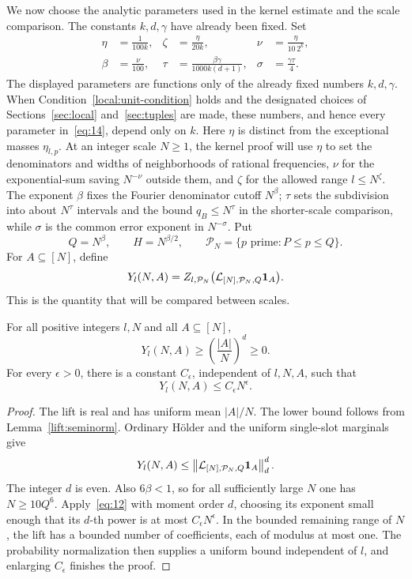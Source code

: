 We now choose the analytic parameters used in the kernel estimate and
the scale comparison.  The constants \(k,d,\gamma\) have already been
fixed.  Set
\begin{equation}
 \begin{aligned}
 \eta&=\frac1{100k},&
 \zeta&=\frac{\eta}{20k},&
 \nu&=\frac{\eta}{10\,2^k},\\
 \beta&=\frac{\nu}{100},&
 \tau&=\frac{\beta\gamma}{1000k(d+1)},&
 \sigma&=\frac{\gamma\tau}{4}.
 \end{aligned}
 \label{eq:14}
\end{equation}
The displayed parameters are functions only of the already fixed numbers
\(k,d,\gamma\).  When Condition~\eqref{local:unit-condition} holds and the
designated choices of Sections~\ref{sec:local} and~\ref{sec:tuples} are made,
these numbers, and hence every parameter in~\eqref{eq:14}, depend only on
\(k\).
Here \(\eta\) is distinct from the exceptional masses \(\eta_{l,p}\).
At an integer scale \(N\ge1\), the kernel proof will use \(\eta\) to
set the denominators and widths of neighborhoods of rational frequencies,
\(\nu\) for the exponential-sum saving \(N^{-\nu}\) outside them,
and \(\zeta\) for the allowed range \(l\le N^\zeta\).
The exponent \(\beta\) fixes the Fourier denominator cutoff \(N^\beta\);
\(\tau\) sets the subdivision into about \(N^\tau\) intervals and
the bound \(q_B\le N^\tau\) in the shorter-scale comparison, while
\(\sigma\) is the common error exponent in \(N^{-\sigma}\).
Put
\[
 Q=N^\beta,\qquad H=N^{\beta/2},\qquad
 \mathcal P_N=\{p\text{ prime}:P\le p\le Q\}.
\]
For \(A\subseteq[N]\), define
\[
 Y_l(N,A)=Z_{l,\mathcal P_N}
             \bigl(\mathcal L_{[N],\mathcal P_N,Q}\mathbf 1_A\bigr).
\]
This is the quantity that will be compared between scales.

\begin{corollary}
\label{lift:density}
For all positive integers \(l,N\) and all \(A\subseteq[N]\),
\[
 Y_l(N,A)\ge\left(\frac{|A|}{N}\right)^d\ge0.
\]
For every \(\epsilon>0\), there is a constant \(C_\epsilon\),
independent of \(l,N,A\), such that
\[
 Y_l(N,A)\le C_\epsilon N^\epsilon.
\]
\end{corollary}

\begin{proof}
The lift is real and has uniform mean \(|A|/N\).  The lower bound
follows from Lemma~\ref{lift:seminorm}.  Ordinary H\"older and the
uniform single-slot marginals give
\[
 Y_l(N,A)\le
 \left\|\mathcal L_{[N],\mathcal P_N,Q}\mathbf 1_A\right\|_d^d.
\]
The integer \(d\) is even.  Also \(6\beta<1\), so for all sufficiently
large \(N\) one has \(N\ge10Q^6\).  Apply~\eqref{eq:12} with moment
order \(d\), choosing its exponent small enough that its \(d\)-th
power is at most \(C_\epsilon N^\epsilon\).  In the bounded remaining
range of \(N\), the lift has a bounded number of coefficients, each of
modulus at most one.  The probability normalization then supplies a
uniform bound independent of \(l\), and enlarging \(C_\epsilon\)
finishes the proof.
\end{proof}

